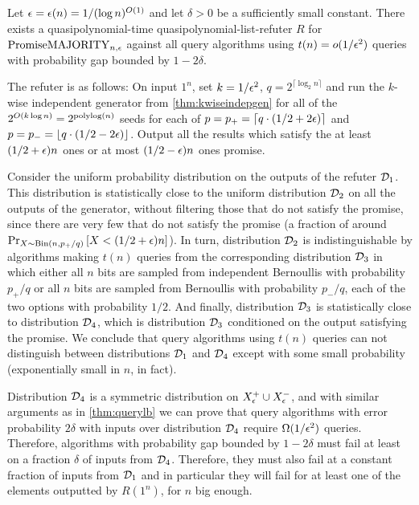 \begin{theorem}
    \label{thm:refutergreatereps}
Let $\epsilon = \epsilon(n) = 1/(\log n)^{O(1)}$ and let $\delta > 0$ be a sufficiently small constant.
There exists a quasipolynomial-time quasipolynomial-list-refuter
$R$ for $\mathrm{PromiseMAJORITY}_{n,\epsilon}$ against all query algorithms using $t(n) = o(1/\epsilon^2)$ queries with probability gap bounded by $1-2\delta$.
\end{theorem}
\begin{proofsketch}
The refuter is as follows: 
On input $1^n$, set $k = 1/\epsilon^2$, $q = 2^{\lceil \log_2 n \rceil}$ and run the $k$-wise independent generator from \cref{thm:kwiseindepgen}
for all of the $2^{O(k \log n)} = 2^{\text{polylog}(n)}$ seeds for each of 
$p = p_+ = \left\lceil q \cdot (1/2 + 2\epsilon) \right\rceil$ and
$p = p_- = \left\lfloor q \cdot (1/2 - 2\epsilon) \right\rfloor$. 
Output all the results which satisfy the at least $(1/2+\epsilon)n$ ones or at most $(1/2-\epsilon)n$ ones promise. 

Consider the uniform probability distribution on the outputs of the refuter $\mathcal{D}_1$. 
This distribution is statistically close to the uniform distribution $\mathcal{D}_2$ on all the outputs
of the generator, without filtering those that do not satisfy the promise, since there are 
very few that do not satisfy the promise 
(a fraction of around $\text{Pr}_{X \sim \text{Bin}(n, p_+/q)}\left[X < (1/2+\epsilon)n\right]$).
In turn, distribution $\mathcal{D}_2$ is indistinguishable by algorithms making $t(n)$ queries
from the corresponding distribution $\mathcal{D}_3$ in which either all $n$ bits are sampled from
independent Bernoullis with probability $p_+/q$ or all $n$ bits are sampled from Bernoullis with
probability $p_-/q$, each of the two options with probability $1/2$. 
And finally, distribution $\mathcal{D}_3$ is statistically close to distribution $\mathcal{D}_4$, which is distribution 
$\mathcal{D}_3$ conditioned on the output satisfying the promise. We conclude that query algorithms using $t(n)$
queries can not distinguish between distributions $\mathcal{D}_1$ and $\mathcal{D}_4$ except with some small probability
(exponentially small in $n$, in fact). 

Distribution $\mathcal{D}_4$ is a symmetric distribution on $X^+_\epsilon \cup X^-_\epsilon$, 
and with similar arguments as in \cref{thm:querylb} 
we can prove that query algorithms with error probability $2\delta$ with inputs 
over distribution $\mathcal{D}_4$ require $\Omega(1/\epsilon^2)$ queries. Therefore, algorithms
with probability gap bounded by $1-2\delta$ must fail at least on a fraction $\delta$ of
inputs from $\mathcal{D}_4$. Therefore, they must also fail at a constant fraction of inputs from $\mathcal{D}_1$
and in particular they will fail for at least one of the elements outputted by $R(1^n)$, for $n$ big enough.

\end{proofsketch}

